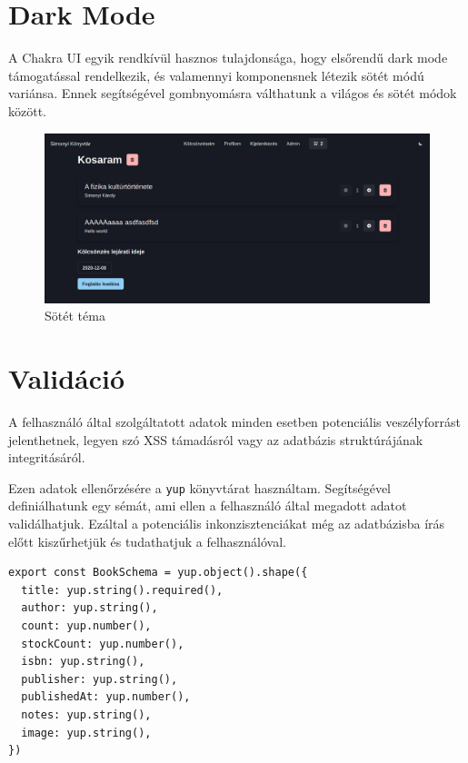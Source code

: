 \section{Dark Mode}

A Chakra UI egyik rendkívül hasznos tulajdonsága, hogy elsőrendű dark mode támogatással rendelkezik, és valamennyi komponensnek
létezik sötét módú variánsa.
Ennek segítségével gombnyomásra válthatunk a világos és sötét módok között.

\begin{figure}[!ht]
  \centering
  \includegraphics[width=150mm, keepaspectratio]{figures/dark-mode.png}
  \caption{Sötét téma}
  \label{fig:DarkMode}
\end{figure}

\section{Validáció}

A felhasználó által szolgáltatott adatok minden esetben potenciális veszélyforrást jelenthetnek, legyen szó XSS támadásról
vagy az adatbázis struktúrájának integritásáról.

Ezen adatok ellenőrzésére a \lstinline|yup| könyvtárat használtam. Segítségével definiálhatunk egy sémát, ami ellen
a felhasználó által megadott adatot validálhatjuk. Ezáltal a potenciális inkonzisztenciákat még az adatbázisba írás előtt
kiszűrhetjük és tudathatjuk a felhasználóval.

\begin{lstlisting}[caption=yup validációs séma a könyvekre]
export const BookSchema = yup.object().shape({
  title: yup.string().required(),
  author: yup.string(),
  count: yup.number(),
  stockCount: yup.number(),
  isbn: yup.string(),
  publisher: yup.string(),
  publishedAt: yup.number(),
  notes: yup.string(),
  image: yup.string(),
})
\end{lstlisting}
